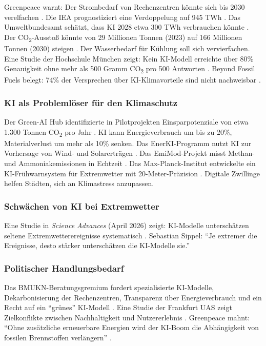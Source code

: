 \documentclass[12pt,a4paper]{article}
\begin{document}
	Greenpeace warnt: Der Strombedarf von Rechenzentren könnte sich bis 2030 verelfachen \cite{Greenpeace2025}. Die IEA prognostiziert eine Verdoppelung auf 945 TWh \cite{IEA2025}. Das Umweltbundesamt schätzt, dass KI 2028 etwa 300 TWh verbrauchen könnte \cite{UBA2025}. Der CO\textsubscript{2}-Ausstoß könnte von 29 Millionen Tonnen (2023) auf 166 Millionen Tonnen (2030) steigen \cite{Oeko2025}. Der Wasserbedarf für Kühlung soll sich vervierfachen. Eine Studie der Hochschule München zeigt: Kein KI-Modell erreichte über 80\% Genauigkeit ohne mehr als 500 Gramm CO\textsubscript{2} pro 500 Antworten \cite{HM2025}. Beyond Fossil Fuels belegt: 74\% der Versprechen über KI-Klimavorteile sind nicht nachweisbar \cite{BeyondFossil2026}.
	
	\subsubsection{KI als Problemlöser für den Klimaschutz}
	
	Der Green-AI Hub identifizierte in Pilotprojekten Einsparpotenziale von etwa 1.300 Tonnen CO\textsubscript{2} pro Jahr \cite{GreenAI2025}. KI kann Energieverbrauch um bis zu 20\%, Materialverlust um mehr als 10\% senken. Das EnerKI-Programm nutzt KI zur Vorhersage von Wind- und Solarerträgen \cite{BMWK2025}. Das EmiMod-Projekt misst Methan- und Ammoniakemissionen in Echtzeit \cite{BMEL2025}. Das Max-Planck-Institut entwickelte ein KI-Frühwarnsystem für Extremwetter mit 20-Meter-Präzision \cite{MPI2025}. Digitale Zwillinge helfen Städten, sich an Klimastress anzupassen.
	
	\subsubsection{Schwächen von KI bei Extremwetter}
	
	Eine Studie in \textit{Science Advances} (April 2026) zeigt: KI-Modelle unterschätzen seltene Extremwetterereignisse systematisch \cite{KIT2026}. Sebastian Sippel: \enquote{Je extremer die Ereignisse, desto stärker unterschätzen die KI-Modelle sie.}
	
	\subsubsection{Politischer Handlungsbedarf}
	
	Das BMUKN-Beratungsgremium fordert spezialisierte KI-Modelle, Dekarbonisierung der Rechenzentren, Transparenz über Energieverbrauch und ein Recht auf ein \enquote{grünes} KI-Modell \cite{BMUKN2026}. Eine Studie der Frankfurt UAS zeigt Zielkonflikte zwischen Nachhaltigkeit und Nutzererlebnis \cite{FrankfurtUAS2026}. Greenpeace mahnt: \enquote{Ohne zusätzliche erneuerbare Energien wird der KI-Boom die Abhängigkeit von fossilen Brennstoffen verlängern} \cite{Greenpeace2025}.
	
\end{document}
